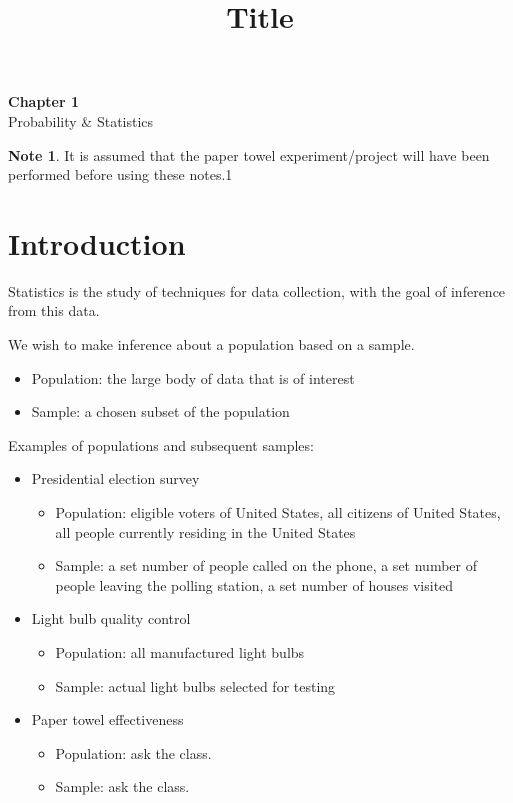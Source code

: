 \documentclass[11pt]{article}
\theoremstyle{definition}
\newtheorem{note}{Note}
\begin{document}
\title{Title}

\thispagestyle{empty}

\begin{center}
{\LARGE \bf Chapter 1}\\
{\large Probability \& Statistics}
\end{center}

\begin{note}
	It is assumed that the paper towel experiment/project will have been performed before using these notes.1
\end{note}

\section{Introduction}
Statistics is the study of techniques for data collection, with the goal of inference from this data.

We wish to make inference about a population based on a sample.
\begin{itemize}
	\item Population: the large body of data that is of interest
	\item Sample: a chosen subset of the population
\end{itemize}

Examples of populations and subsequent samples:
\begin{itemize}
	\item Presidential election survey
		\begin{itemize}
			\item Population: eligible voters of United States, all citizens of United States, all people currently residing in the United States
			\item Sample: a set number of people called on the phone, a set number of people leaving the polling station, a set number of houses visited
		\end{itemize}
	\item Light bulb quality control
		\begin{itemize}
			\item Population: all manufactured light bulbs
			\item Sample: actual light bulbs selected for testing
		\end{itemize}
	\item Paper towel effectiveness
		\begin{itemize}
			\item Population: ask the class.
			\item Sample: ask the class.
		\end{itemize}
\end{itemize}
\end{document}
